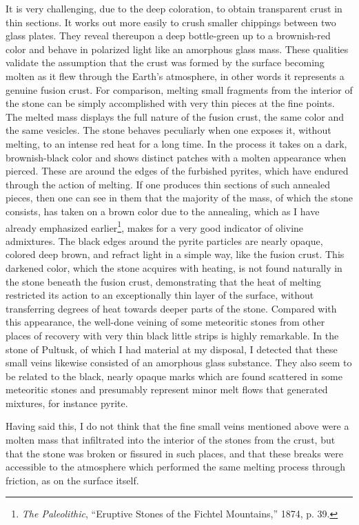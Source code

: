 \documentclass[a4paper, 12pt, oneside]{article}
\begin{document}
It is very challenging, due to the deep coloration, to obtain transparent crust in thin sections. It works out more easily to crush smaller chippings between two glass plates. They reveal thereupon a deep bottle-green up to a brownish-red color and behave in polarized light like an amorphous glass mass. These qualities validate the assumption that the crust was formed by the surface becoming molten as it flew through the Earth's atmosphere, in other words it represents a genuine fusion crust. For comparison, melting small fragments from the interior of the stone can be simply accomplished with very thin pieces at the fine points. The melted mass displays the full nature of the fusion crust, the same color and the same vesicles. The stone behaves peculiarly when one exposes it, without melting, to an intense red heat for a long time. In the process it takes on a dark, brownish-black color and shows distinct patches with a molten appearance when pierced. These are around the edges of the furbished pyrites, which have endured through the action of melting. If one produces thin sections of such annealed pieces, then one can see in them that the majority of the mass, of which the stone consists, has taken on a brown color due to the annealing, which as I have already emphasized earlier\footnote{\emph{The Paleolithic}, ``Eruptive Stones of the Fichtel Mountains,'' 1874, p. 39.}, makes for a very good indicator of olivine admixtures. The black edges around the pyrite particles are nearly opaque, colored deep brown, and refract light in a simple way, like the fusion crust. This darkened color, which the stone acquires with heating, is not found naturally in the stone beneath the fusion crust, demonstrating that the heat of melting restricted its action to an exceptionally thin layer of the surface, without transferring degrees of heat towards deeper parts of the stone. Compared with this appearance, the well-done veining of some meteoritic stones from other places of recovery with very thin black little strips is highly remarkable. In the stone of Pultusk, of which I had material at my disposal, I detected that these small veins likewise consisted of an amorphous glass substance. They also seem to be related to the black, nearly opaque marks which are found scattered in some meteoritic stones and presumably represent minor melt flows that generated mixtures, for instance pyrite.

Having said this, I do not think that the fine small veins mentioned above were a molten mass that infiltrated into the interior of the stones from the crust, but that the stone was broken or fissured in such places, and that these breaks were accessible to the atmosphere which performed the same melting process through friction, as on the surface itself.
\clearpage
\end{document}
